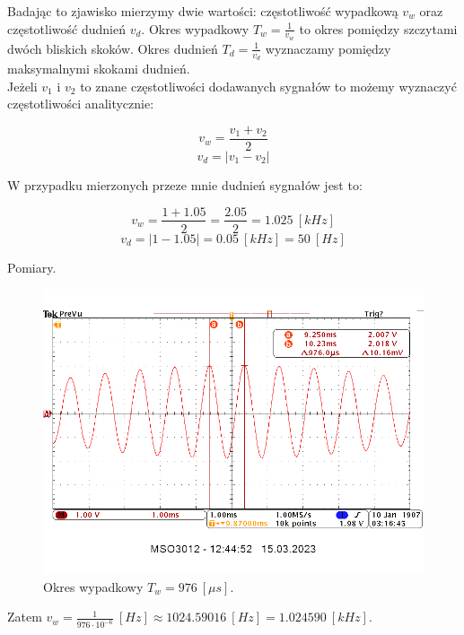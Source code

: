 \documentclass[14pt, table]{extarticle}
\begin{document}
Badając to zjawisko mierzymy dwie wartości: częstotliwość wypadkową $v_w$ oraz częstotliwość dudnień $v_d$. Okres wypadkowy $T_w = \frac{1}{v_w}$  to okres pomiędzy szczytami dwóch bliskich skoków. Okres dudnień $T_d = \frac{1}{v_d}$ wyznaczamy pomiędzy maksymalnymi skokami dudnień.\\ 

Jeżeli $v_1$ i $v_2$ to znane częstotliwości dodawanych sygnałów to możemy wyznaczyć częstotliwości analitycznie:

$$ v_w = \frac{v_1 + v_2}{2} $$ 
$$ v_d = \left| v_1 - v_2 \right| $$

W przypadku mierzonych przeze mnie dudnień sygnałów jest to:

$$ v_w = \frac{1 + 1.05}{2} = \frac{2.05}{2} = 1.025 \ [kHz]$$ 
$$ v_d = \left| 1 - 1.05 \right| = 0.05 \ [kHz] = 50 \ [Hz]$$

\newpage
Pomiary.

\begin{figure}[H]
\includegraphics[scale=0.65]{A3}
\centering
\captionsetup{labelformat=empty}
\caption{Okres wypadkowy $T_w = 976 \ [\mu s]$.}
\end{figure}

Zatem $v_w = \frac{1}{976 \cdot 10^{-6}} \ [Hz] \approx 1024.59016 \ [Hz] = 1.024590 \ [kHz]$.
\end{document}
